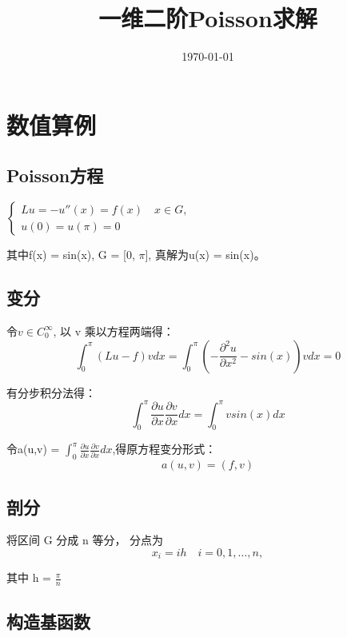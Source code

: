 \documentclass[UTF8]{ctexart}
\title{一维二阶Poisson求解}
\date{\today}
\begin{document}
\maketitle	
\section{数值算例}
\subsection{Poisson方程}
$
\begin{cases}
Lu = -u''(x) = f(x) \quad x \in G, \\
u(0)=u(\pi)=0
\end{cases}
$ \\
\par
其中f(x) = sin(x), G = [0, $\pi$], 真解为u(x) = sin(x)。
\subsection{变分}

令$v \in C_0^\infty $, 以 v 乘以方程两端得：
$$
\int_0^\pi (Lu - f) v dx = \int_0^\pi (- \frac{\partial^2 u}{\partial x^2} - sin(x)) v dx = 0
$$
\par
有分步积分法得：
$$
\int_0^\pi \frac{\partial u}{\partial x} \frac{\partial v}{\partial x} dx = \int_0^\pi v sin(x) dx
$$
\par 
令a(u,v) = $\int_0^\pi \frac{\partial u}{\partial x} \frac{\partial v}{\partial x} dx$,得原方程变分形式：
$$
a(u,v) = (f,v)
$$

\subsection{剖分}

将区间 G 分成 n 等分， 分点为
$$
x_i = ih \quad i = 0,1,...,n,
$$
\par 
其中 h = $\frac{\pi}{n}$ 

\subsection{构造基函数}
\end{document}
